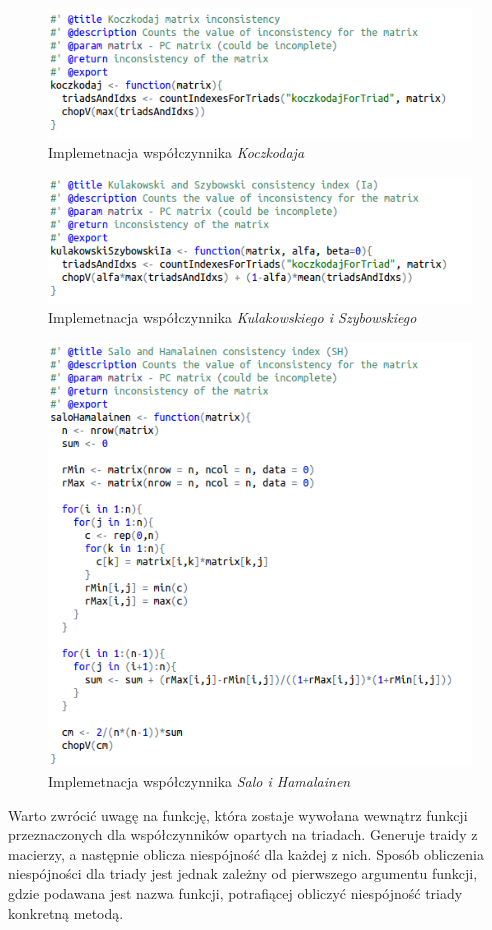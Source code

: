 \begin{figure}[ht]
\centerline{\includegraphics[scale=0.75]{images/kod2.png}}
\caption{Implemetnacja współczynnika \textit{Koczkodaja}}
\label{fig:rstudio}
\end{figure}

\begin{figure}[ht]
\centerline{\includegraphics[scale=0.75]{images/kod3.png}}
\caption{Implemetnacja współczynnika \textit{Kulakowskiego i Szybowskiego}}
\label{fig:rstudio}
\end{figure}

\begin{figure}[ht]
\centerline{\includegraphics[scale=0.75]{images/kod4.png}}
\caption{Implemetnacja współczynnika \textit{Salo i Hamalainen}}
\label{fig:rstudio}
\end{figure}
Warto zwrócić uwagę na funkcję, która zostaje wywołana wewnątrz funkcji przeznaczonych dla współczynników opartych na triadach. Generuje traidy z macierzy, a następnie oblicza niespójność dla każdej z nich. Sposób obliczenia niespójności dla triady jest jednak zależny od pierwszego argumentu funkcji, gdzie podawana jest nazwa funkcji, potrafiącej obliczyć niespójność triady konkretną metodą.

